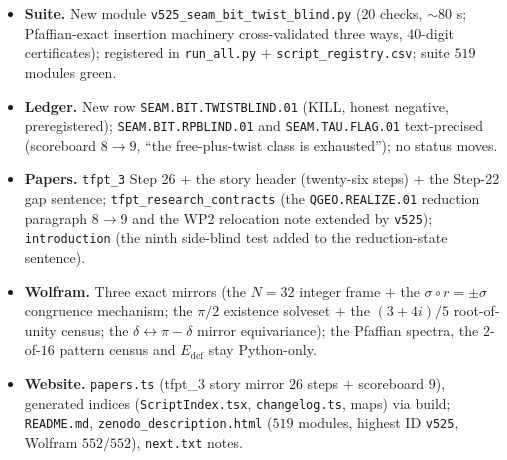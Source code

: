 \documentclass[11pt]{article}
\providecommand{\vref}[1]{\texttt{#1}}
\begin{document}
\begin{itemize}[leftmargin=1.5em]
\item \textbf{Suite.} New module \texttt{v525\_seam\_bit\_twist\_blind.py} ($20$ checks, $\sim80$ s;
Pfaffian-exact insertion machinery cross-validated three ways, $40$-digit certificates);
registered in \texttt{run\_all.py} $+$ \texttt{script\_registry.csv}; suite $519$ modules green.
\item \textbf{Ledger.} New row \texttt{SEAM.BIT.TWISTBLIND.01} (KILL, honest negative,
preregistered); \texttt{SEAM.BIT.RPBLIND.01} and \texttt{SEAM.TAU.FLAG.01} text-precised
(scoreboard $8\to9$, ``the free-plus-twist class is exhausted''); no status moves.
\item \textbf{Papers.} \texttt{tfpt\_3} Step 26 $+$ the story header (twenty-six steps) $+$ the
Step-22 gap sentence; \texttt{tfpt\_research\_contracts} (the \texttt{QGEO.REALIZE.01}
reduction paragraph $8\to9$ and the WP2 relocation note extended by \vref{v525});
\texttt{introduction} (the ninth side-blind test added to the reduction-state sentence).
\item \textbf{Wolfram.} Three exact mirrors (the $N=32$ integer frame $+$ the
$\sigma\circ r=\pm\sigma$ congruence mechanism; the $\pi/2$ existence solveset $+$ the
$(3+4i)/5$ root-of-unity census; the $\delta\leftrightarrow\pi-\delta$ mirror equivariance);
the Pfaffian spectra, the $2$-of-$16$ pattern census and $E_{\mathrm{def}}$ stay Python-only.
\item \textbf{Website.} \texttt{papers.ts} (tfpt\_3 story mirror $26$ steps $+$ scoreboard $9$),
generated indices (\texttt{ScriptIndex.tsx}, \texttt{changelog.ts}, maps) via build;
\texttt{README.md}, \texttt{zenodo\_description.html} ($519$ modules, highest ID
\texttt{v525}, Wolfram $552/552$), \texttt{next.txt} notes.
\end{itemize}
\end{document}
